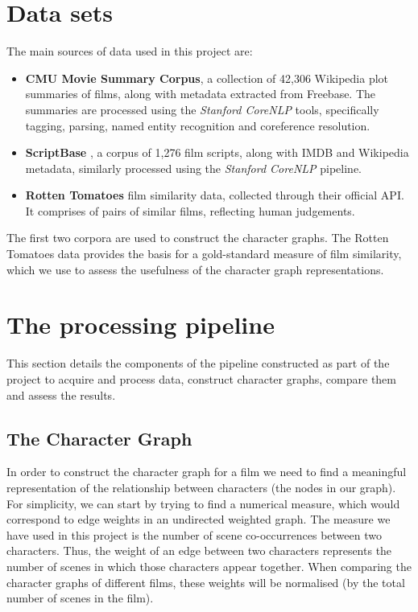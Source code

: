 \documentclass[bsc,frontabs,singlespacing,parskip]{infthesis} %
\begin{document}
\section{Data sets}
The main sources of data used in this project are:
\begin{itemize}
	\item \textbf{CMU Movie Summary Corpus}, a collection of 42,306 Wikipedia plot summaries of films, along with metadata extracted from Freebase. The summaries are processed using the \textit{Stanford CoreNLP} tools, specifically tagging, parsing, named entity recognition and coreference resolution.
	\item \textbf{ScriptBase} \cite{Gorinski}, a corpus of 1,276 film scripts, along with IMDB and Wikipedia metadata, similarly processed using the \textit{Stanford CoreNLP} pipeline.
	\item \textbf{Rotten Tomatoes} film similarity data, collected through their official API. It comprises of pairs of similar films, reflecting human judgements.
\end{itemize}

The first two corpora are used to construct the character graphs. The Rotten Tomatoes data provides the basis for a gold-standard measure of film similarity, which we use to assess the usefulness of the character graph representations.

\section{The processing pipeline}
This section details the components of the pipeline constructed as part of the project to acquire and process data, construct character graphs, compare them and assess the results.

\subsection{The Character Graph}
In order to construct the character graph for a film we need to find a meaningful representation of the relationship between characters (the nodes in our graph). For simplicity, we can start by trying to find a numerical measure, which would correspond to edge weights in an undirected weighted graph. The measure we have used in this project is the number of scene co-occurrences between two characters. Thus, the weight of an edge between two characters represents the number of scenes in which those characters appear together. When comparing the character graphs of different films, these weights will be normalised (by the total number of scenes in the film).
\end{document}
